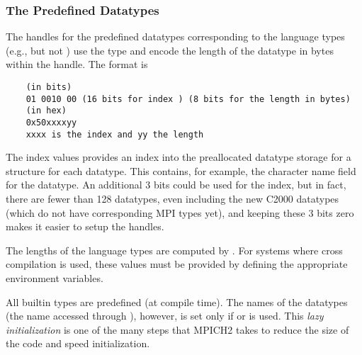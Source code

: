\documentclass{article}
\begin{document}
\subsubsection{The Predefined Datatypes}
The handles for the predefined datatypes corresponding to the language types
(e.g.,  but not ) use the
 type and encode the length of the datatype in bytes
within the handle.  The format is
\begin{verbatim}
    (in bits)
    01 0010 00 (16 bits for index ) (8 bits for the length in bytes)
    (in hex)
    0x50xxxxyy
    xxxx is the index and yy the length
\end{verbatim}
The index values provides an index into the preallocated datatype storage for
a  structure for each datatype.  This contains, for
example, the character name field for the datatype.
An additional 3 bits could be used for the index, but in fact, there are fewer
than 128 datatypes, even including the new C2000 datatypes (which do not have
corresponding MPI types yet), and keeping these 3 bits zero makes it easier to
setup the handles.

The lengths of the language types are computed by .  For
systems where cross compilation is used, these values must be provided by
defining the appropriate  environment variables.

All builtin types are predefined (at compile time).  
The names of the datatypes (the name accessed through
), however, is set only if 
 or  is used.
This \emph{lazy initialization} is one of the many steps that MPICH2
takes to reduce the size of the code and speed initialization.
\end{document}
